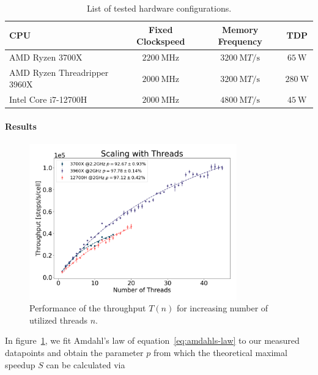 \documentclass[fontsize=11pt,a4paper]{article}
\begin{document}
\begin{table}
    \centering
    \begin{tabular}{l c c c}
        CPU & Fixed Clockspeed & Memory Frequency & TDP\\
        \hline
        AMD Ryzen 3700X~\cite{AMDProductSpecifications} & $\SI{2200}{\mega\hertz}$
            & $\SI{3200}{\mega T\per\second}$ & $\SI{65}{\watt}$\\
        AMD Ryzen Threadripper 3960X~\cite{AMDProductSpecifications} & $\SI{2000}{\mega\hertz}$
            & $\SI{3200}{\mega T\per\second}$ & $\SI{280}{\watt}$\\
        Intel Core i7-12700H~\cite{Inteli712700H} & $\SI{2000}{\mega\hertz}$
            & $\SI{4800}{\mega T\per\second}$
            & $\SI{45}{\watt}$\\
    \end{tabular}
    \caption{List of tested hardware configurations.}
    \label{tab:hardware-configurations}
\end{table}

\paragraph{Results}

\begin{figure}
    \centering
    \includegraphics[width=0.8\textwidth]{figures/thread_scaling.png}
    \caption{Performance of the throughput $T(n)$ for increasing number of utilized threads $n$.}
    \label{fig:amdahls-law-fit}
\end{figure}

In figure~\ref{fig:amdahls-law-fit}, we fit Amdahl's law of equation~\ref{eq:amdahls-law} to our
measured datapoints and obtain the parameter $p$ from which the theoretical maximal speedup $S$ can
be calculated via
\end{document}
